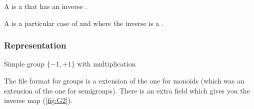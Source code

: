 
A \Group is a \Monoid that has an inverse \Mapping.


A \FiniteGroup is a particular case of \Group and \FiniteMonoid where the inverse is a \FiniteMap.


\subsubsection*{Representation}

\begin{marginfigure}%
	\caption{Simple group $\{-1,+1\}$ with multiplication}%
	\label{fig:G2}%
\end{marginfigure}%

The file format for groups is a extension of the one for monoids (which was an extension of the one for semigroups).
There is an extra field  which gives you the inverse map (\cref{fig:G2}).


